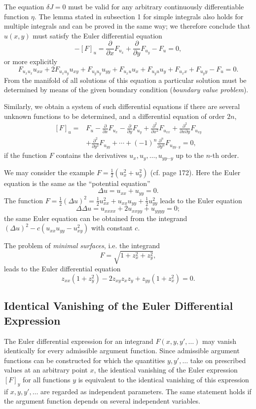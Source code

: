 The equation $\delta J=0$ must be valid for any arbitrary continuously differentiable function $\eta$. The lemma stated in subsection 1 for simple integrals also holds for multiple integrals and can be proved in the same way; we therefore conclude that $u(x,y)$ must satisfy the Euler differential equation
\begin{equation}\tag{25}
-[F]_u=\frac{\partial}{\partial x}F_{u_x}+\frac{\partial}{\partial y}F_{u_y}-F_u=0,
\end{equation}
or more explicitly
\[
F_{u_xu_x}u_{xx}+2F_{u_xu_y}u_{xy}+F_{u_yu_y}u_{yy}+F_{u_xu}u_x+F_{u_yu}u_y
+F_{u_x x}+F_{u_y y}-F_u=0.
\]
From the manifold of all solutions of this equation a particular solution must be determined by means of the given boundary condition (\emph{boundary value problem}).

Similarly, we obtain a system of such differential equations if there are several unknown functions to be determined, and a differential equation of order $2n$,
\begin{align}\tag{26}
[F]_u={}&F_u-\frac{\partial}{\partial x}F_{u_x}-\frac{\partial}{\partial y}F_{u_y}
+\frac{\partial^2}{\partial x^2}F_{u_{xx}}+\frac{\partial^2}{\partial x\partial y}F_{u_{xy}}\\
&+\frac{\partial^2}{\partial y^2}F_{u_{yy}}+\cdots+(-1)^n\frac{\partial^n}{\partial y^n}F_{u_{yy\cdots y}}=0,
\end{align}
if the function $F$ contains the derivatives $u_x,u_y,\ldots,u_{yy\cdots y}$ up to the $n$-th order.

We may consider the example $F=\tfrac12(u_x^2+u_y^2)$ (cf. page 172). Here the Euler equation is the same as the ``potential equation''
\[
\Delta u=u_{xx}+u_{yy}=0.
\]
The function $F=\tfrac12(\Delta u)^2=\tfrac12u_{xx}^2+u_{xx}u_{yy}+\tfrac12u_{yy}^2$ leads to the Euler equation
\[
\Delta\Delta u=u_{xxxx}+2u_{xxyy}+u_{yyyy}=0;
\]
the same Euler equation can be obtained from the integrand $(\Delta u)^2-c(u_{xx}u_{yy}-u_{xy}^2)$ with constant $c$.

The problem of \emph{minimal surfaces}, i.e. the integrand
\[
F=\sqrt{1+z_x^2+z_y^2},
\]
leads to the Euler differential equation
\[
z_{xx}(1+z_y^2)-2z_{xy}z_xz_y+z_{yy}(1+z_x^2)=0.
\]

\subsection{Identical Vanishing of the Euler Differential Expression}
The Euler differential expression for an integrand $F(x,y,y',\ldots)$ may vanish identically for every admissible argument function. Since admissible argument functions can be constructed for which the quantities $y,y',\ldots$ take on prescribed values at an arbitrary point $x$, the identical vanishing of the Euler expression $[F]_y$ for all functions $y$ is equivalent to the identical vanishing of this expression if $x,y,y',\ldots$ are regarded as independent parameters. The same statement holds if the argument function depends on several independent variables.

